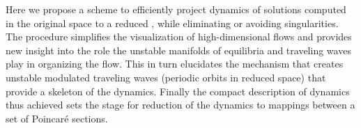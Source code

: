 Here we propose a scheme to efficiently project dynamics of
solutions computed in the original space to a reduced \statesp,
while eliminating or avoiding singularities. The procedure simplifies
the visualization of high-dimensional flows and provides new
insight into the role the unstable manifolds of equilibria and
traveling waves play in organizing the flow. This in turn elucidates the mechanism
that creates unstable modulated traveling waves (periodic orbits in reduced space)
that provide a skeleton of the dynamics. Finally the compact description
of dynamics thus achieved sets the stage for
reduction of the dynamics to mappings between a set of Poincar\'e sections.
